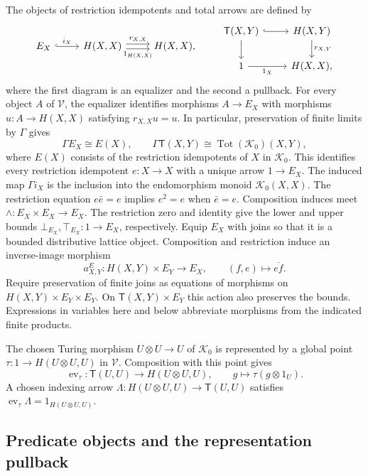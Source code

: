 \documentclass[11pt]{article}
\theoremstyle{definition}
\theoremstyle{remark}
\begin{document}
The objects of restriction idempotents and total arrows are defined by
\[
\begin{tikzcd}
 E_X \arrow[r, hook, "i_X"] & H(X,X)
 \arrow[r, shift left, "r_{X,X}"]
 \arrow[r, shift right, swap, "1_{H(X,X)}"] & H(X,X),
\end{tikzcd}
\qquad
\begin{tikzcd}
 \mathsf T(X,Y) \arrow[r, hook] \arrow[d] & H(X,Y) \arrow[d, "r_{X,Y}"]\\
 1 \arrow[r, "1_X"'] & H(X,X),
\end{tikzcd}
\]
where the first diagram is an equalizer and the second a pullback.
For every object $A$ of $\mathscr V$, the equalizer identifies
morphisms $A\to E_X$ with morphisms $u:A\to H(X,X)$ satisfying
$r_{X,X}u=u$. In particular, preservation of finite limits by
$\Gamma$ gives
\[
 \Gamma E_X\cong E(X),\qquad
 \Gamma \mathsf T(X,Y)\cong\operatorname{Tot}(\mathcal K_0)(X,Y),
\]
where $E(X)$ consists of the restriction idempotents of $X$ in
$\mathcal K_0$. This identifies every restriction idempotent
$e:X\to X$ with a unique arrow $1\to E_X$.
The induced map $\Gamma i_X$ is the inclusion into the
endomorphism monoid $\mathcal K_0(X,X)$. The restriction equation
$e\bar e=e$ implies $e^2=e$ when $\bar e=e$.
Composition induces meet $\wedge:E_X\times E_X\to E_X$.
The restriction zero and identity give the lower and upper
bounds $\bot_{E_X},\top_{E_X}:1\to E_X$, respectively.
Equip $E_X$ with joins so that it is a bounded distributive lattice
object. Composition and restriction induce an inverse-image morphism
\[
 a^E_{X,Y}:H(X,Y)\times E_Y\longrightarrow E_X,
 \qquad (f,e)\longmapsto\overline{ef}.
\]
Require preservation of finite joins as equations of morphisms on
$H(X,Y)\times E_Y\times E_Y$. On $\mathsf T(X,Y)\times E_Y$ this
action also preserves the bounds. Expressions in variables here
and below abbreviate morphisms from the indicated finite products.

The chosen Turing morphism $U\otimes U\to U$ of $\mathcal K_0$
is represented by a global point $\tau:1\to H(U\otimes U,U)$
in $\mathscr V$. Composition with this point gives
\[
 \operatorname{ev}_\tau:\mathsf T(U,U)\longrightarrow H(U\otimes U,U),
 \qquad g\longmapsto\tau(g\otimes1_U).
\]
A chosen indexing arrow
$\Lambda:H(U\otimes U,U)\to \mathsf T(U,U)$ satisfies
$\operatorname{ev}_\tau\Lambda=1_{H(U\otimes U,U)}$.

\subsection{Predicate objects and the representation pullback}
\label{sec:generalized-definability-algebras}
\end{document}
